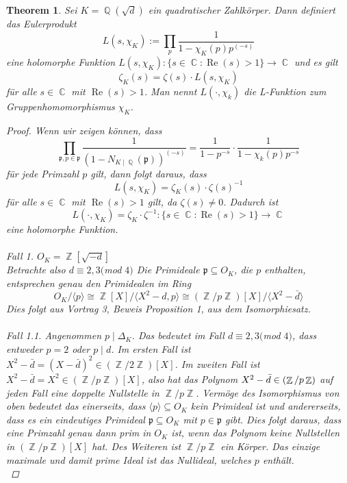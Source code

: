 \documentclass[10pt,a4paper]{article}
\theoremstyle{plain}
\newtheorem{thm}{Theorem}[section]
\theoremstyle{definition}
\theoremstyle{remark}
\DeclareMathOperator{\C}{\mathbb{C}}
\DeclareMathOperator{\Q}{\mathbb{Q}}
\DeclareMathOperator{\Z}{\mathbb{Z}}
\DeclareMathOperator{\re}{Re}
\begin{document}
\begin{thm}

Sei $K=\Q(\sqrt{d})$ ein quadratischer Zahlkörper. Dann definiert das Eulerprodukt $$L(s,\chi_K) := \prod_{p}\frac{1}{1-\chi_K(p)p^{(-s)}} $$ eine holomorphe Funktion $L(s,\chi_K) \colon \{s \in \C \colon \re(s) > 1\} \rightarrow \C$ und es gilt $$\zeta_K(s) = \zeta(s)\cdot L(s,\chi_K) $$ für alle $s \in \C $ mit $ \re(s) > 1$. Man nennt $L(\cdot,\chi_k)$ die L-Funktion zum Gruppenhomomorphismus $\chi_K$.

\begin{proof}

Wenn wir zeigen können, dass $$\prod_{\mathfrak{p},p \in \mathfrak{p}}\frac{1}{(1- N_{K\mid \Q}(\mathfrak{p}))^{(-s)}}= \frac{1}{1-p^{-s}}\cdot\frac{1}{1-\chi_k(p)p^{-s}}$$ für jede Primzahl $p$ gilt, dann folgt daraus, dass $$L(s,\chi_K)= \zeta_K(s)\cdot \zeta(s)^{-1}$$ für alle $s \in \C $ mit $ \re(s)>1$ gilt, da $\zeta(s) \neq 0$. Dadurch ist $$L(\cdot,\chi_K)= \zeta_K\cdot \zeta^{-1}\colon \{s \in \C \colon \re(s)>1\}\rightarrow \C$$ eine holomorphe Funktion.
\\
\\
\textit{Fall 1.}
$O_K= \Z[\sqrt{-d}]$ \\
Betrachte also $d\equiv2,3 ($mod $ 4)$
Die Primideale $\mathfrak{p} \subseteq O_K$, die $p$ enthalten, entsprechen genau den Primidealen im Ring $$O_K /\langle p\rangle \cong \Z[X] /\langle X^2-d,p\rangle \cong (\Z/p\Z)[X]/\langle X^2-\bar{d}\rangle$$  Dies folgt aus Vortrag 3, Beweis Proposition 1, aus dem Isomorphiesatz.
\\
\\
\textit{Fall 1.1.}
Angenommen $p \mid \Delta_K$. Das bedeutet im Fall $d \equiv2,3 ($mod $ 4)$, dass entweder $p = 2$ oder $p \mid d$. Im ersten Fall ist $X^2-\bar{d} = (X-\bar{d})^2 \in (\Z/2\Z)[X]$.
Im zweiten Fall ist $X^2-\bar{d} = X^2 \in (\Z/p\Z)[X]$, also hat das Polynom $X^2-\bar{d} \\ \in (\Z/p\Z)$ auf jeden Fall eine doppelte Nullstelle in $\Z/p\Z$. Vermöge des Isomorphismus von oben bedeutet das einerseits, dass $\langle p\rangle \subseteq O_K$ kein Primideal ist und andererseits, dass es ein eindeutiges Primideal $\mathfrak{p} \subseteq O_K$ mit $p \in \mathfrak{p}$ gibt. Dies folgt daraus, dass eine Primzahl genau dann prim in $O_K$  ist, wenn das Polynom keine Nullstellen in $(\Z/p\Z)[X]$ hat. Des Weiteren ist $\Z/p\Z$ ein Körper. Das einzige maximale und damit prime Ideal ist das Nullideal, welches $p$ enthält.
\\

\end{proof}
\end{thm}
\end{document}
